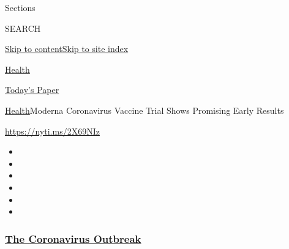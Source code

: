 Sections

SEARCH

\protect\hyperlink{site-content}{Skip to
content}\protect\hyperlink{site-index}{Skip to site index}

\href{https://www.nytimes3xbfgragh.onion/section/health}{Health}

\href{https://myaccount.nytimes3xbfgragh.onion/auth/login?response_type=cookie\&client_id=vi}{}

\href{https://www.nytimes3xbfgragh.onion/section/todayspaper}{Today's
Paper}

\href{/section/health}{Health}\textbar{}Moderna Coronavirus Vaccine
Trial Shows Promising Early Results

\url{https://nyti.ms/2X69NIz}

\begin{itemize}
\item
\item
\item
\item
\item
\item
\end{itemize}

\hypertarget{the-coronavirus-outbreak}{%
\subsubsection{\texorpdfstring{\href{https://www.nytimes3xbfgragh.onion/news-event/coronavirus?name=styln-coronavirus-national\&region=TOP_BANNER\&block=storyline_menu_recirc\&action=click\&pgtype=Article\&impression_id=0e25f610-f291-11ea-834c-e760e465928d\&variant=undefined}{The
Coronavirus
Outbreak}}{The Coronavirus Outbreak}}\label{the-coronavirus-outbreak}}

